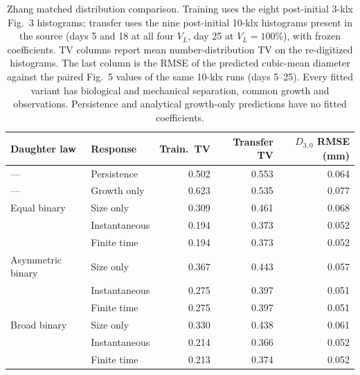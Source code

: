 \begin{table}[H]
\centering\small
\caption{Zhang matched distribution comparison. Training uses the eight post-initial 3-klx Fig.~3 histograms; transfer uses the nine post-initial 10-klx histograms present in the source (days 5 and 18 at all four $V_L$, day 25 at $V_L=100\%$), with frozen coefficients. TV columns report mean number-distribution TV on the re-digitized histograms. The last column is the RMSE of the predicted cubic-mean diameter against the paired Fig.~5 values of the same 10-klx runs (days 5--25). Every fitted variant has biological and mechanical separation, common growth and observations. Persistence and analytical growth-only predictions have no fitted coefficients.}
\label{tab:zhang-matched}
\setlength{\tabcolsep}{4pt}
\begin{tabular}{llrrr}
\toprule
Daughter law & Response & Train.\ TV & Transfer TV & $D_{3,0}$ RMSE (mm) \\
\midrule
--- & Persistence & 0.502 & 0.553 & 0.064 \\
--- & Growth only & 0.623 & 0.535 & 0.077 \\
\midrule
Equal binary & Size only & 0.309 & 0.461 & 0.068 \\
 & Instantaneous & 0.194 & 0.373 & 0.052 \\
 & Finite time & 0.194 & 0.373 & 0.052 \\
\midrule
Asymmetric binary & Size only & 0.367 & 0.443 & 0.057 \\
 & Instantaneous & 0.275 & 0.397 & 0.051 \\
 & Finite time & 0.275 & 0.397 & 0.051 \\
\midrule
Broad binary & Size only & 0.330 & 0.438 & 0.061 \\
 & Instantaneous & 0.214 & 0.366 & 0.052 \\
 & Finite time & 0.213 & 0.374 & 0.052 \\
\bottomrule
\end{tabular}
\end{table}

